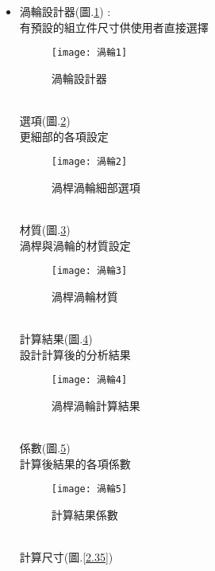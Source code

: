 \begin{itemize}
\newpage	
	
	\item 渦輪設計器(圖.\ref{2.30}) :\\
		有預設的組立件尺寸供使用者直接選擇\\
		\begin{figure}[hbt!]
		\begin{center}
		\texttt{[image: 渦輪1]}
		\caption{\Large 渦輪設計器}\label{2.30}
		\end{center}
		\end{figure}
		\\
		選項(圖.\ref{2.31}) \\
		更細部的各項設定\\
		\begin{figure}[hbt!]
		\begin{center}
		\texttt{[image: 渦輪2]}
		\caption{\Large 渦桿渦輪細部選項}\label{2.31}
		\end{center}
		\end{figure}
		\\
		材質(圖.\ref{2.32}) \\
		渦桿與渦輪的材質設定\\
		\begin{figure}[hbt!]
		\begin{center}
		\texttt{[image: 渦輪3]}
		\caption{\Large 渦桿渦輪材質}\label{2.32}
		\end{center}
		\end{figure}
		\\
		計算結果(圖.\ref{2.33}) \\
		設計計算後的分析結果\\
		\begin{figure}[hbt!]
		\begin{center}
		\texttt{[image: 渦輪4]}
		\caption{\Large 渦桿渦輪計算結果}\label{2.33}
		\end{center}
		\end{figure}
		\\
		係數(圖.\ref{2.34}) \\
		計算後結果的各項係數\\
		\begin{figure}[hbt!]
		\begin{center}
		\texttt{[image: 渦輪5]}
		\caption{\Large 計算結果係數}\label{2.34}
		\end{center}
		\end{figure}
		\\
		計算尺寸(圖.\ref{2.35}) \\

\end{itemize}
